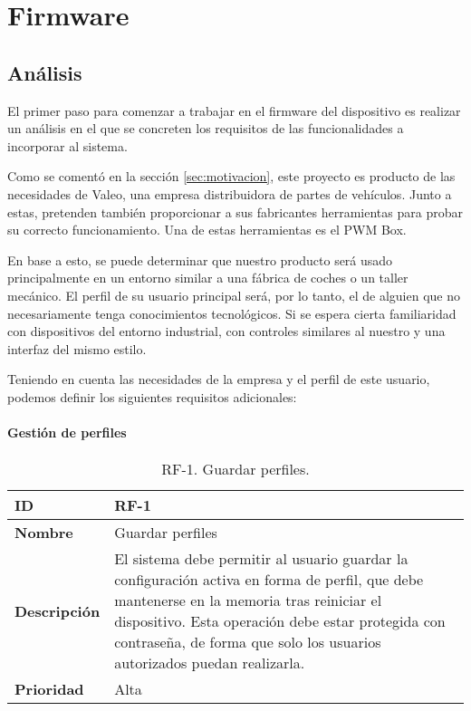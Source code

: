 \chapter{Firmware}
\label{ch:firmware}

\section{Análisis}
\label{sec:fw_analisis}

El primer paso para comenzar a trabajar en el firmware del dispositivo es realizar un análisis en el que se concreten los requisitos de las funcionalidades a incorporar al sistema.

Como se comentó en la sección \ref{sec:motivacion}, este proyecto es producto de las necesidades de Valeo, una empresa distribuidora de partes de vehículos. Junto a estas, pretenden también proporcionar a sus fabricantes herramientas para probar su correcto funcionamiento. Una de estas herramientas es el PWM Box.

En base a esto, se puede determinar que nuestro producto será usado principalmente en un entorno similar a una fábrica de coches o un taller mecánico. El perfil de su usuario principal será, por lo tanto, el de alguien que no necesariamente tenga conocimientos tecnológicos. Si se espera cierta familiaridad con dispositivos del entorno industrial, con controles similares al nuestro y una interfaz del mismo estilo.

Teniendo en cuenta las necesidades de la empresa y el perfil de este usuario, podemos definir los siguientes requisitos adicionales:

\clearpage

\subsubsection{Gestión de perfiles}

\begin{table}[h!]
    \centering
    \begin{tabular}{|m{2.5cm}|m{9.27cm}|}
        \hline
        \textbf{ID} & RF-1 \\
        \hline
        \textbf{Nombre} & Guardar perfiles \\
        \hline
        \textbf{Descripción} & El sistema debe permitir al usuario guardar la configuración activa en forma de perfil, que debe mantenerse en la memoria tras reiniciar el dispositivo. Esta operación debe estar protegida con contraseña, de forma que solo los usuarios autorizados puedan realizarla. \\
        \hline
        \textbf{Prioridad} & Alta \\
        \hline
    \end{tabular}
    \caption{RF-1. Guardar perfiles.}
\end{table}

